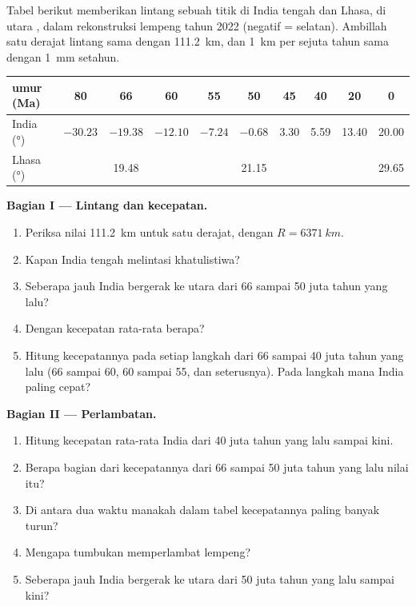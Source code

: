 \begin{problem}
\label{pb:g12:mountain-building:1}
Tabel berikut memberikan lintang sebuah titik di India tengah dan Lhasa, di
utara , dalam rekonstruksi lempeng tahun 2022 (negatif = selatan).
Ambillah satu derajat lintang sama dengan \qty{111.2}{km}, dan \qty{1}{km} per
sejuta tahun sama dengan \qty{1}{mm} setahun.

\begin{center}
\small
\begin{tabular}{|l|c|c|c|c|c|c|c|c|c|}
\hline
umur (\unit{Ma}) & 80 & 66 & 60 & 55 & 50 & 45 & 40 & 20 & 0 \\ \hline
India (\unit{\degree}) & $-30.23$ & $-19.38$ & $-12.10$ & $-7.24$ & $-0.68$ & 3.30 & 5.59 & 13.40 & 20.00 \\ \hline
Lhasa (\unit{\degree}) & & 19.48 & & & 21.15 & & & & 29.65 \\ \hline
\end{tabular}
\end{center}

\medskip
\noindent\textbf{Bagian I --- Lintang dan kecepatan.}
\begin{enumerate}
  \item Periksa nilai \qty{111.2}{km} untuk satu derajat, dengan $R =
        \qty{6371}{km}$.
  \item Kapan India tengah melintasi khatulistiwa?
  \item Seberapa jauh India bergerak ke utara dari 66 sampai 50 juta tahun
        yang lalu?
  \item Dengan kecepatan rata-rata berapa?
  \item Hitung kecepatannya pada setiap langkah dari 66 sampai 40 juta tahun
        yang lalu (66 sampai 60, 60 sampai 55, dan seterusnya). Pada langkah
        mana India paling cepat?
\end{enumerate}

\medskip
\noindent\textbf{Bagian II --- Perlambatan.}
\begin{enumerate}[resume]
  \item Hitung kecepatan rata-rata India dari 40 juta tahun yang lalu sampai
        kini.
  \item Berapa bagian dari kecepatannya dari 66 sampai 50 juta tahun yang lalu
        nilai itu?
  \item Di antara dua waktu manakah dalam tabel kecepatannya paling banyak
        turun?
  \item Mengapa tumbukan memperlambat lempeng?
  \item Seberapa jauh India bergerak ke utara dari 50 juta tahun yang lalu
        sampai kini?
\end{enumerate}


\end{problem}
